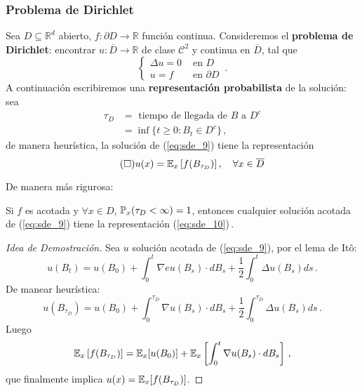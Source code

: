 \subsubsection{Problema de Dirichlet}
Sea $D \subseteq \mathbb{R}^d$ abierto, $f:\partial D \to \mathbb{R}$ función continua. Consideremos el \textbf{problema de Dirichlet}: encontrar $u: \overline{D} \to  \mathbb{R}$ de clase $\mathcal{C}^2$ y continua en $\overline{D}$, tal que 
\begin{equation*}
    \label{eq:sde_9}
    \tag{D}
    \begin{cases}
        \Delta u = 0 & \text{ en } D \\ 
        u = f & \text{ en } \partial D
    \end{cases} \,.
\end{equation*}
A continuación escribiremos una \textbf{representación probabilista} de la solución: sea 
\begin{align*}
    \tau_D & = \text{ tiempo de llegada de } B \text{ a }  D^{c} \\
    &= \inf \{ t \ge 0 : B_t \in D^{c} \} \,,
\end{align*}
de manera heurística, la solución de (\ref{eq:sde_9}) tiene la representación 
\begin{equation*}
    \label{eq:sde_10} 
    \tag{$ \square$}
    u(x) = \E_{x} \left[ f(B_{\tau_D}) \right], ~ ~ ~ \forall x \in \overline{D}
\end{equation*}

De manera más rigurosa:
\begin{theorem}
    Si $f$ es acotada y $\forall x \in D$, $\P_x ( \tau_D < \infty) = 1$, entonces cualquier solución acotada de (\ref{eq:sde_9}) tiene la representación (\ref{eq:sde_10})\,.
\end{theorem}
\begin{proof}[Idea de Demostración]
\gris
Sea $u$ solución acotada de (\ref{eq:sde_9}), por el lema de It\^{o}: 
\begin{equation*}
    u(B_t) = u(B_0) + \int_{0}^{t} \nabla e u (B_s) \cdot dB_s + \frac{1}{2} \int_{0}^{t} \Delta u(B_s) ds \,.
\end{equation*}
De manear heurística: 
\begin{equation*}
    u(B_{\tau_D}) = u(B_0) + \int_{0}^{\tau_D} \nabla u(B_s) \cdot  dB_s + \frac{1}{2} \int_{0}^{\tau_D} \Delta u(B_s) ds \,.
\end{equation*}
Luego 
\begin{align*}
    \E_x \left[ f(B_{\tau_D}) \right] = \E_x[u(B_0)] + \E_x \left[ \int_{0}^{t} \nabla u (B_s) \cdot dB_s \right] \,,
\end{align*}
que finalmente implica $u(x) = \E_x[f(B_{\tau_{D}})]$.
\findem
\negro
\end{proof}

